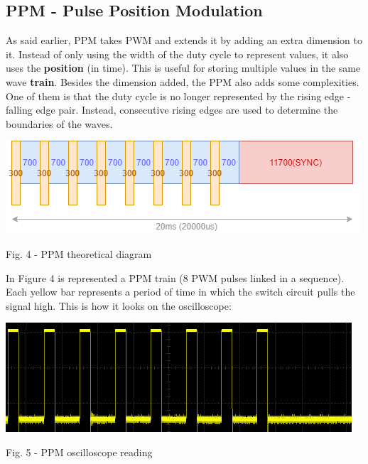 \documentclass{IEEEtran}
\begin{document}
\subsection*{PPM - Pulse Position Modulation}
As said earlier, PPM takes PWM and extends it by adding an extra dimension to it. Instead of only using the width of the duty cycle to represent values, it also uses the \textbf{position} (in time). This is useful for storing multiple values in the same wave \textbf{train}. Besides the dimension added, the PPM also adds some complexities. One of them is that the duty cycle is no longer represented by the rising edge - falling edge pair. Instead, consecutive rising edges are used to determine the boundaries of the waves.
\newline
\begin{center}\includegraphics[scale=.5]{ppm2.png}\end{center}
\begin{it}\begin{center}Fig. 4 - PPM theoretical diagram \end{center}\end{it}
In Figure 4 is represented a PPM train (8 PWM pulses linked in a sequence). Each yellow bar represents a period of time in which the switch circuit pulls the signal high. 
\newline
This is how it looks on the oscilloscope: 
\newline
\begin{center}\includegraphics[scale=.5]{ppm.png}\end{center}
\begin{it}\begin{center}Fig. 5 - PPM oscilloscope reading\end{center}\end{it}
\end{document}

